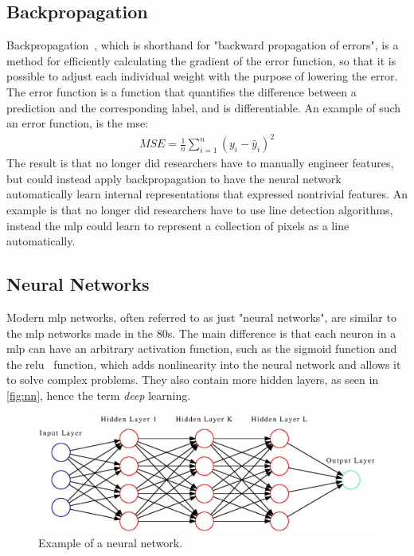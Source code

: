 \subsection{Backpropagation}
Backpropagation~\cite{backprop}, which is shorthand for "backward propagation of errors",  is a method for efficiently calculating the gradient of the error function, so that it is possible to adjust each individual weight with the purpose of lowering the error. The error function is a function that quantifies the difference between a prediction and the corresponding label, and is differentiable. An example of such an error function, is the \gls*{mse}:
\begin{align*}
    MSE=\frac{1}{n}\sum_{i=1}^n (y_i-\hat{y}_i)^2
\end{align*}
The result is that no longer did researchers have to manually engineer features, but could instead apply backpropagation to have the neural network automatically learn internal representations that expressed nontrivial features. An example is that no longer did researchers have to use line detection algorithms, instead the \gls*{mlp} could learn to represent a collection of pixels as a line automatically.
\subsection{Neural Networks}
Modern \gls*{mlp} networks, often referred to as just "neural networks", are similar to the \gls*{mlp} networks made in the 80s. The main difference is that each neuron in a \gls*{mlp} can have an arbitrary activation function, such as the sigmoid function and the \gls*{relu}~\cite{relu} function, which adds nonlinearity into the neural network and allows it to solve complex problems. They also contain more hidden layers, as seen in \autoref{fig:nn}, hence the term \emph{deep} learning.
\begin{figure}[H]
    \centering
    \includegraphics[width=\linewidth]{resources/related_works/nn.gv.eps}
    \caption[Neural Network Example]{Example of a neural network.}
    \label{fig:nn}
\end{figure}
